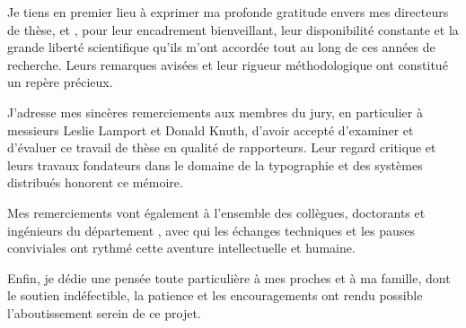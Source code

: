 
Je tiens en premier lieu à exprimer ma profonde gratitude envers mes directeurs de thèse,
\getsupervisor{} et \getcosupervisor,
pour leur encadrement bienveillant,
leur disponibilité constante
et la grande liberté scientifique qu'ils m'ont accordée tout au long de ces années de recherche.
Leurs remarques avisées et leur rigueur méthodologique ont constitué un repère précieux.

J'adresse mes sincères remerciements aux membres du jury,
en particulier à messieurs Leslie Lamport et Donald Knuth,
d'avoir accepté d'examiner et d'évaluer ce travail de thèse en qualité de rapporteurs.
Leur regard critique et leurs travaux fondateurs dans le domaine de la typographie
et des systèmes distribués honorent ce mémoire.

Mes remerciements vont également à l'ensemble des collègues, doctorants et ingénieurs
du département \getdepartment,
avec qui les échanges techniques et les pauses conviviales
ont rythmé cette aventure intellectuelle et humaine.

Enfin, je dédie une pensée toute particulière à mes proches et à ma famille,
dont le soutien indéfectible,
la patience et les encouragements
ont rendu possible l'aboutissement serein de ce projet.

